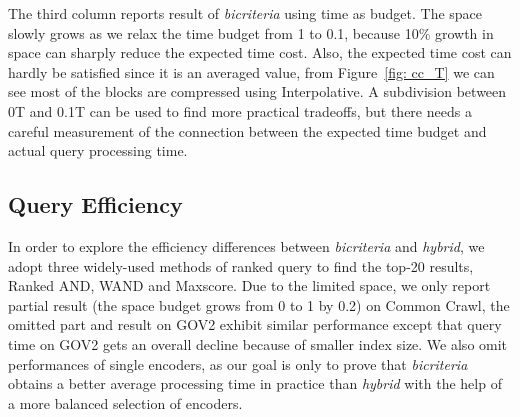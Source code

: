 \documentclass{sig-alternate-05-2015}
\begin{document}
The third column reports result of \textit{bicriteria} using time as budget.
The space slowly grows as we relax the time budget from 1 to 0.1, because 10\% growth in space can sharply reduce the expected time cost.
Also, the expected time cost can hardly be satisfied since it is an averaged value, from Figure~\ref{fig: cc_T} we can see most of the blocks are compressed using Interpolative.
A subdivision between 0T and 0.1T can be used to find more practical tradeoffs, but there needs a careful measurement of the connection between the expected time budget and actual query processing time. 

\subsection{Query Efficiency}
In order to explore the efficiency differences between \textit{bicriteria} and \textit{hybrid}, we adopt three widely-used methods of ranked query to find the top-20 results, Ranked AND, WAND and Maxscore.
Due to the limited space, we only report partial result (the space budget grows from 0 to 1 by 0.2) on Common Crawl, the omitted part and result on GOV2 exhibit similar performance except that query time on GOV2 gets an overall decline because of smaller index size.
We also omit performances of single encoders, as our goal is only to prove that \textit{bicriteria} obtains a better average processing time in practice than \textit{hybrid} with the help of a more balanced selection of encoders.
\end{document}
